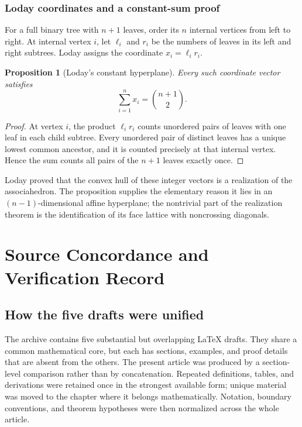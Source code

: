 \documentclass[11pt,a4paper,oneside,openany]{book}
\newtheorem{proposition}[theorem]{Proposition}
\theoremstyle{definition}
\theoremstyle{remark}
\begin{document}
\section{Loday coordinates and a constant-sum proof}

For a full binary tree with $n+1$ leaves, order its $n$ internal vertices from
left to right. At internal vertex $i$, let $\ell_i$ and $r_i$ be the numbers of
leaves in its left and right subtrees. Loday assigns the coordinate
$x_i=\ell_i r_i$.

\begin{proposition}[Loday's constant hyperplane]
\label{unif:prop-loday-hyperplane}
Every such coordinate vector satisfies
\begin{equation}\label{unif:eq-loday-hyperplane}
 \sum_{i=1}^{n}x_i=\binom{n+1}{2}.
\end{equation}
\end{proposition}
\begin{proof}
At vertex $i$, the product $\ell_i r_i$ counts unordered pairs of leaves with
one leaf in each child subtree. Every unordered pair of distinct leaves has a
unique lowest common ancestor, and it is counted precisely at that internal
vertex. Hence the sum counts all pairs of the $n+1$ leaves exactly once.
\end{proof}

Loday proved that the convex hull of these integer vectors is a realization of
the associahedron. The proposition supplies the elementary reason it lies in
an $(n-1)$-dimensional affine hyperplane; the nontrivial part of the realization
theorem is the identification of its face lattice with noncrossing diagonals.


\part{Source Concordance and Verification Record}

\chapter{How the five drafts were unified}
\label{unif:ch-concordance}

The archive contains five substantial but overlapping LaTeX drafts. They share
a common mathematical core, but each has sections, examples, and proof details
that are absent from the others. The present article was produced by a
section-level comparison rather than by concatenation. Repeated definitions,
tables, and derivations were retained once in the strongest available form;
unique material was moved to the chapter where it belongs mathematically.
Notation, boundary conventions, and theorem hypotheses were then normalized
across the whole article.
\end{document}
